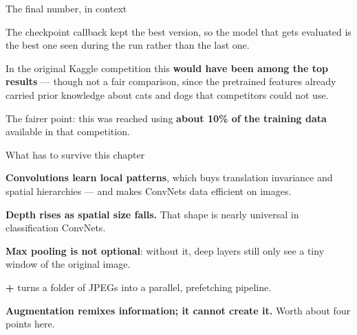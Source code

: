 \documentclass[aspectratio=169,11pt,t]{beamer}
\begin{document}
\begin{frame}[shrink=25]{The final number, in context}
{\fontsize{9.4}{12.6}\selectfont\color{fg2}The checkpoint callback kept the best version, so the model that gets evaluated is the best one seen during the run rather than the last one.\par}\vskip 4pt
{\fontsize{9.4}{12.6}\selectfont\color{fg2}In the original Kaggle competition this \textbf{would have been among the top results} --- though not a fair comparison, since the pretrained features already carried prior knowledge about cats and dogs that competitors could not use.\par}\vskip 4pt
\begin{iband}[signal]
The fairer point: this was reached using \textbf{about 10\% of the training data} available in that competition. 
\end{iband}
\end{frame}

\begin{frame}[shrink=25]{What has to survive this chapter}
\begin{isteps}
\item \textbf{Convolutions learn local patterns}, which buys translation invariance and spatial hierarchies --- and makes ConvNets data efficient on images.
\item \textbf{Depth rises as spatial size falls.} That shape is nearly universal in classification ConvNets.
\item \textbf{Max pooling is not optional}: without it, deep layers still only see a tiny window of the original image.
\item \textbf{ + } turns a folder of JPEGs into a parallel, prefetching pipeline.
\item \textbf{Augmentation remixes information; it cannot create it.} Worth about four points here.
\end{isteps}
\end{frame}
\end{document}
